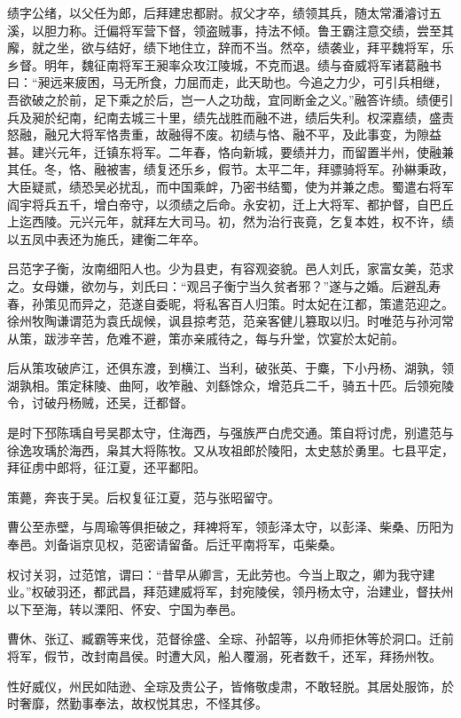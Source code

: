 \documentclass[12pt,UTF8]{ctexbook}
\begin{document}
绩字公绪，以父任为郎，后拜建忠都尉。叔父才卒，绩领其兵，随太常潘濬讨五溪，以胆力称。迁偏将军营下督，领盗贼事，持法不倾。鲁王霸注意交绩，尝至其廨，就之坐，欲与结好，绩下地住立，辞而不当。然卒，绩袭业，拜平魏将军，乐乡督。明年，魏征南将军王昶率众攻江陵城，不克而退。绩与奋威将军诸葛融书曰：“昶远来疲困，马无所食，力屈而走，此天助也。今追之力少，可引兵相继，吾欲破之於前，足下乘之於后，岂一人之功哉，宜同断金之义。”融答许绩。绩便引兵及昶於纪南，纪南去城三十里，绩先战胜而融不进，绩后失利。权深嘉绩，盛责怒融，融兄大将军恪贵重，故融得不废。初绩与恪、融不平，及此事变，为隙益甚。建兴元年，迁镇东将军。二年春，恪向新城，要绩并力，而留置半州，使融兼其任。冬，恪、融被害，绩复还乐乡，假节。太平二年，拜骠骑将军。孙綝秉政，大臣疑贰，绩恐吴必扰乱，而中国乘衅，乃密书结蜀，使为并兼之虑。蜀遣右将军阎宇将兵五千，增白帝守，以须绩之后命。永安初，迁上大将军、都护督，自巴丘上迄西陵。元兴元年，就拜左大司马。初，然为治行丧竟，乞复本姓，权不许，绩以五凤中表还为施氏，建衡二年卒。

吕范字子衡，汝南细阳人也。少为县吏，有容观姿貌。邑人刘氏，家富女美，范求之。女母嫌，欲勿与，刘氏曰：“观吕子衡宁当久贫者邪？”遂与之婚。后避乱寿春，孙策见而异之，范遂自委昵，将私客百人归策。时太妃在江都，策遣范迎之。徐州牧陶谦谓范为袁氏觇候，讽县掠考范，范亲客健儿篡取以归。时唯范与孙河常从策，跋涉辛苦，危难不避，策亦亲戚待之，每与升堂，饮宴於太妃前。

后从策攻破庐江，还俱东渡，到横江、当利，破张英、于麋，下小丹杨、湖孰，领湖孰相。策定秣陵、曲阿，收笮融、刘繇馀众，增范兵二千，骑五十匹。后领宛陵令，讨破丹杨贼，还吴，迁都督。

是时下邳陈瑀自号吴郡太守，住海西，与强族严白虎交通。策自将讨虎，别遣范与徐逸攻瑀於海西，枭其大将陈牧。又从攻祖郎於陵阳，太史慈於勇里。七县平定，拜征虏中郎将，征江夏，还平鄱阳。

策薨，奔丧于吴。后权复征江夏，范与张昭留守。

曹公至赤壁，与周瑜等俱拒破之，拜裨将军，领彭泽太守，以彭泽、柴桑、历阳为奉邑。刘备诣京见权，范密请留备。后迁平南将军，屯柴桑。

权讨关羽，过范馆，谓曰：“昔早从卿言，无此劳也。今当上取之，卿为我守建业。”权破羽还，都武昌，拜范建威将军，封宛陵侯，领丹杨太守，治建业，督扶州以下至海，转以溧阳、怀安、宁国为奉邑。

曹休、张辽、臧霸等来伐，范督徐盛、全琮、孙韶等，以舟师拒休等於洞口。迁前将军，假节，改封南昌侯。时遭大风，船人覆溺，死者数千，还军，拜扬州牧。

性好威仪，州民如陆逊、全琮及贵公子，皆脩敬虔肃，不敢轻脱。其居处服饰，於时奢靡，然勤事奉法，故权悦其忠，不怪其侈。
\end{document}
